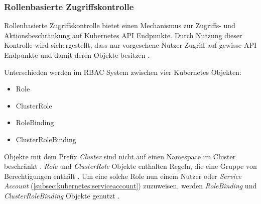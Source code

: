 \subsubsection{Rollenbasierte Zugriffskontrolle}
\label{subsec:kubernetes:rbac}
Rollenbasierte Zugriffskontrolle bietet einen Mechanismus zur Zugriffs- und Aktionsbeschränkung auf Kubernetes API Endpunkte.
Durch Nutzung dieser Kontrolle wird sichergestellt, dass nur vorgesehene Nutzer Zugriff auf gewisse API Endpunkte und damit deren
Objekte besitzen \cite{Burns2019}.

Unterschieden werden im \ac{RBAC} System zwischen vier Kubernetes Objekten:
\begin{itemize}
  \item Role
  \item ClusterRole
  \item RoleBinding
  \item ClusterRoleBinding
\end{itemize}

Objekte mit dem Prefix \emph{Cluster} sind nicht auf einen Namespace im Cluster beschränkt \cite{kubernetesRbac}.
\emph{Role} und \emph{ClusterRole} Objekte enthalten Regeln, die eine Gruppe von Berechtigungen enthält \cite{kubernetesRbac}.
Um eine solche Role nun einem Nutzer oder \emph{Service Account} (\ref{subsec:kubernetes:serviceaccount}) zuzuweisen,
werden \emph{RoleBinding} und \emph{ClusterRoleBinding} Objekte genutzt \cite{Burns2019}.
